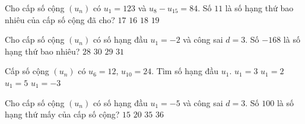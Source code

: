 \begin{ex}%
	Cho cấp số cộng $(u_n)$ có $u_1=123$ và $u_8-u_{15}=84$. Số $11$ là số hạng  thứ bao nhiêu của cấp số cộng đã cho?
	 \choice
		 {\True $17$}
		 {$16$}
		 {$18$}
		 {$19$}
\end{ex}

\begin{ex}%
	Cho cấp số  cộng $(u_n)$ có số hạng đầu $u_1 = -2$ và công sai $d = 3$. Số $-168$ là số hạng thứ bao nhiêu?
	 \choice
		 {$28$}
		 {$30$}
		{\True $29$} 
		 {$31$}
\end{ex}

\begin{ex}%
	Cấp số cộng $(u_n)$ có  $u_6=12$, $u_{10}=24$. Tìm số hạng đầu $u_1$.
	\choice 
		{$u_1=3$} 
		{$u_1=2$} 
		{$u_1=5$} 
		{\True $u_1=-3$} 
\end{ex}

\begin{ex}%
	Cho cấp số cộng $\left(u_n \right)$ có số hạng đầu $u_1=-5$ và công sai $d=3$. Số $100$ là số hạng thứ mấy của cấp  số cộng?
	 \choice
		{$15$} 
		 {$20$}
		 {$35$}
		 {\True $36$}
\end{ex}

